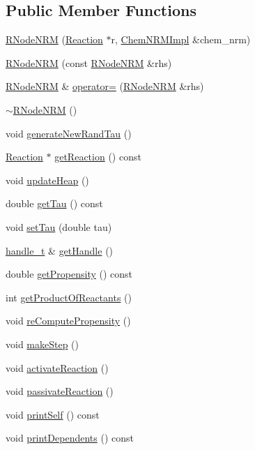 \subsection*{Public Member Functions}
\begin{DoxyCompactItemize}
\item 
\hyperlink{classRNodeNRM_aeda348b7904812a6841164359c9f8bb1}{R\-Node\-N\-R\-M} (\hyperlink{classReaction}{Reaction} $\ast$r, \hyperlink{classChemNRMImpl}{Chem\-N\-R\-M\-Impl} \&chem\-\_\-nrm)
\item 
\hyperlink{classRNodeNRM_ad7ce5c671d76a7299123c1fc2de7bd79}{R\-Node\-N\-R\-M} (const \hyperlink{classRNodeNRM}{R\-Node\-N\-R\-M} \&rhs)
\item 
\hyperlink{classRNodeNRM}{R\-Node\-N\-R\-M} \& \hyperlink{classRNodeNRM_ac512d106e9fc82f1f46fff5c4a5d2c6d}{operator=} (\hyperlink{classRNodeNRM}{R\-Node\-N\-R\-M} \&rhs)
\item 
\hyperlink{classRNodeNRM_ae08297123307fe3087d07573dd91b141}{$\sim$\-R\-Node\-N\-R\-M} ()
\item 
void \hyperlink{classRNodeNRM_a7067410e41c97db4e5b49f2f4ff68fb1}{generate\-New\-Rand\-Tau} ()
\item 
\hyperlink{classReaction}{Reaction} $\ast$ \hyperlink{classRNodeNRM_a422a4f300867f441fe9eec1385c6e40e}{get\-Reaction} () const 
\item 
void \hyperlink{classRNodeNRM_a961e39b7ae8f226c58e9e7bd6381a61f}{update\-Heap} ()
\item 
double \hyperlink{classRNodeNRM_a0f5092b9a9ffc87dcfb83db7a69f6353}{get\-Tau} () const 
\item 
void \hyperlink{classRNodeNRM_a1dfb224d15b638f2f0bb0fed115a46c4}{set\-Tau} (double tau)
\item 
\hyperlink{ChemNRMImpl_8h_a386f0f8003798d7e30dc670c31be1992}{handle\-\_\-t} \& \hyperlink{classRNodeNRM_a088d958ddbc589f232a498695898d147}{get\-Handle} ()
\item 
double \hyperlink{classRNodeNRM_aea98802552bcd307b78668571996ec83}{get\-Propensity} () const 
\item 
int \hyperlink{classRNodeNRM_a45f544a919f0d3b9cf0b75e484d8d32e}{get\-Product\-Of\-Reactants} ()
\item 
void \hyperlink{classRNodeNRM_a975ba28a7c1cfcd5f2ffaae8401b7b74}{re\-Compute\-Propensity} ()
\item 
void \hyperlink{classRNodeNRM_adeeec1e8186ce2cfc004cfe242eaa30d}{make\-Step} ()
\item 
void \hyperlink{classRNodeNRM_a37054113d33f02fad5a9daa4c7130ba4}{activate\-Reaction} ()
\item 
void \hyperlink{classRNodeNRM_a21b4c0345217a78b61952a13ef3a6d5e}{passivate\-Reaction} ()
\item 
void \hyperlink{classRNodeNRM_ae04662a366d10fd7b033d1aa3f9f2817}{print\-Self} () const 
\item 
void \hyperlink{classRNodeNRM_ac3fed6dc98796d32c294f505c2fcc466}{print\-Dependents} () const 
\end{DoxyCompactItemize}

